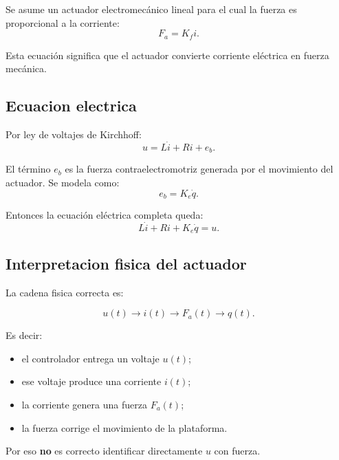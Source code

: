 \documentclass[11pt]{article}
\begin{document}
Se asume un actuador electromec\'anico lineal para el cual la fuerza es proporcional a la corriente:
\begin{equation}
F_a = K_f i.
\label{eq:force_current}
\end{equation}

Esta ecuaci\'on significa que el actuador convierte corriente el\'ectrica en fuerza mec\'anica.

\subsection{Ecuacion electrica}

Por ley de voltajes de Kirchhoff:
\begin{equation}
u = L\dot i + Ri + e_b.
\label{eq:kvl}
\end{equation}

El t\'ermino $e_b$ es la fuerza contraelectromotriz generada por el movimiento del actuador. Se modela como:
\begin{equation}
e_b = K_e \dot q.
\label{eq:bemf}
\end{equation}

Entonces la ecuaci\'on el\'ectrica completa queda:
\begin{equation}
L\dot i + Ri + K_e\dot q = u.
\label{eq:elec}
\end{equation}

\subsection{Interpretacion fisica del actuador}

La cadena fisica correcta es:

\begin{equation*}
u(t)\longrightarrow i(t)\longrightarrow F_a(t)\longrightarrow q(t).
\end{equation*}

Es decir:

\begin{itemize}[leftmargin=1.2cm]
\item el controlador entrega un voltaje $u(t)$;
\item ese voltaje produce una corriente $i(t)$;
\item la corriente genera una fuerza $F_a(t)$;
\item la fuerza corrige el movimiento de la plataforma.
\end{itemize}

Por eso \textbf{no} es correcto identificar directamente $u$ con fuerza.
\end{document}
